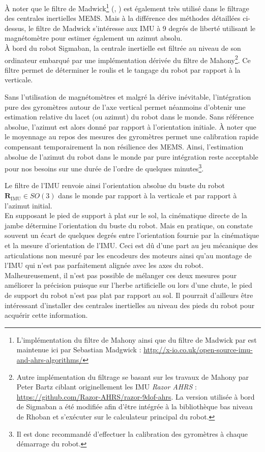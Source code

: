 À noter que le filtre de 
Madwick\footnote{L'implémentation du filtre de Mahony ainsi que du filtre 
de Madwick par est maintenue ici par Sebastian Madgwick : \url{http://x-io.co.uk/open-source-imu-and-ahrs-algorithms/}}
(\cite{madgwick_efficient_2010}, \cite{madgwick_estimation_2011})
est également très utilisé dans le filtrage des centrales inertielles MEMS.
Mais à la différence des méthodes détaillées ci-dessus, le filtre de Madwick s'intéresse
aux IMU à 9 degrés de liberté utilisant le magnétomètre pour estimer également un azimut absolu.\\

À bord du robot Sigmaban, la centrale inertielle est filtrée au niveau de son
ordinateur embarqué par une implémentation dérivée du filtre 
de Mahony\footnote{Autre implémentation du filtrage se basant sur les travaux de Mahony par Peter Bartz 
ciblant originellement les IMU \textit{Razor AHRS}  : \url{https://github.com/Razor-AHRS/razor-9dof-ahrs}.
La version utilisée à bord de Sigmaban a été modifiée afin d'être intégrée 
à la bibliothèque bas niveau de Rhoban et s'exécuter sur le calculateur principal du robot.}.
Ce filtre permet de déterminer le roulis et le tangage du robot par rapport à la verticale.

Sans l'utilisation de magnétomètres et malgré la dérive inévitable, l'intégration
pure des gyromètres autour de l'axe vertical permet néanmoins d'obtenir une
estimation relative du lacet (ou azimut) du robot dans le monde. 
Sans référence absolue, l'azimut est alors donné par 
rapport à l'orientation initiale.
À noter que le moyennage au repos des mesures des gyromètres permet
une calibration rapide compensant temporairement la non résilience des MEMS.
Ainsi, l'estimation absolue de l'azimut du robot dans le monde par pure
intégration reste acceptable pour nos besoins sur une durée de l'ordre
de quelques minutes\footnote{Il est donc recommandé d'effectuer la calibration 
des gyromètres à chaque démarrage du robot.}.

Le filtre de l'IMU renvoie ainsi l'orientation
absolue du buste du robot $\bm{R}_{\text{IMU}} \in SO(3)$ dans le monde 
par rapport à la verticale et par rapport à l'azimut initial.\\

En supposant le pied de support à plat sur le sol, 
la cinématique directe de la jambe détermine l'orientation 
du buste du robot.
Mais en pratique, on constate souvent un écart de quelques
degrés entre l'orientation fournie par la cinématique et 
la mesure d'orientation de l'IMU.
Ceci est dû d'une part au jeu mécanique des articulations 
non mesuré par les encodeurs des moteurs ainsi qu'au
montage de l'IMU qui n'est pas parfaitement alignée avec les 
axes du robot.
Malheureusement, il n'est pas possible de mélanger ces deux mesures
pour améliorer la précision puisque sur l'herbe artificielle ou lors
d'une chute, le pied de support du robot n'est pas plat par rapport au sol.
Il pourrait d'ailleurs être intéressant d'installer des centrales inertielles
au niveau des pieds du robot pour acquérir cette information.

